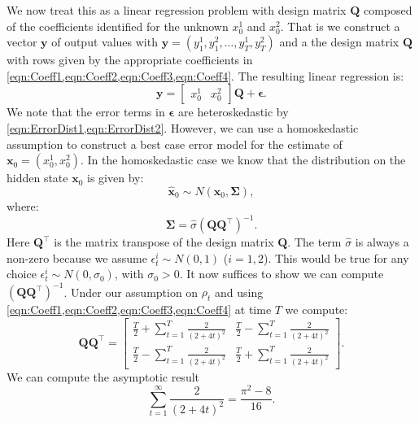 \documentclass[aps,superscriptaddress,floatfix,amsmath,amssymb]{revtex4-2}
\begin{document}
We now treat this as a linear regression problem with design matrix $\mathbf{Q}$ composed of the coefficients identified for the unknown $x^1_0$ and $x^2_0$. That is we construct a vector $\mathbf{y}$ of output values with $\mathbf{y} = (y_1^1, y^2_1, \dots, y^1_T, y^2_T)$ and a the design matrix $\mathbf{Q}$ with rows given by the appropriate coefficients in \cref{eqn:Coeff1,eqn:Coeff2,eqn:Coeff3,eqn:Coeff4}. The resulting linear regression is:
\begin{displaymath}
\mathbf{y} = \begin{bmatrix} x^1_0 & x^2_0\end{bmatrix}\mathbf{Q} + \bm{\epsilon}.
\end{displaymath}
We note that the error terms in $\bm{\epsilon}$ are heteroskedastic by \cref{eqn:ErrorDist1,eqn:ErrorDist2}. However, we can use a homoskedastic assumption to construct a best case error model for the estimate of $\mathbf{x}_0 = (x^1_0,x^2_0)$. In the homoskedastic case we know that the distribution on the hidden state $\mathbf{x}_0$ is given by:
\begin{displaymath}
\hat{\mathbf{x}}_0 \sim N(\mathbf{x}_0, \bm{\Sigma}),
\end{displaymath} 
where:
\begin{equation}
\bm{\Sigma} = \hat{\sigma}\left(\mathbf{Q}\mathbf{Q}^\top\right)^{-1}.
\label{eqn:SigmaVariation}
\end{equation}
Here $\mathbf{Q}^\top$ is the matrix transpose of the design matrix $\mathbf{Q}$. The term $\hat{\sigma}$ is always a non-zero because we assume $\epsilon_t^i \sim N(0,1)$ ($i=1,2$). This would be true for any choice $\epsilon_t^i \sim N(0,\sigma_0)$, with $\sigma_0 > 0$. It now suffices to show we can compute $\left(\mathbf{Q}\mathbf{Q}^\top\right)^{-1}$. Under our assumption on $\rho_t$ and using \cref{eqn:Coeff1,eqn:Coeff2,eqn:Coeff3,eqn:Coeff4} at time $T$ we compute:
\begin{displaymath}
\mathbf{Q}\mathbf{Q}^\top = 
\begin{bmatrix} \frac{T}{2} + \sum_{t=1}^T\frac{2}{(2+4t)^2} & \frac{T}{2} - \sum_{t=1}^T\frac{2}{(2+4t)^2}\\
\frac{T}{2} - \sum_{t=1}^T\frac{2}{(2+4t)^2} &\frac{T}{2} + \sum_{t=1}^T\frac{2}{(2+4t)^2}
\end{bmatrix}.
\end{displaymath} 
We can compute the asymptotic result
\begin{displaymath}
\sum_{t=1}^\infty\frac{2}{(2+4t)^2} = \frac{\pi^2-8}{16}.
\end{displaymath}
\end{document}
